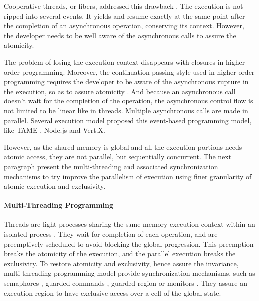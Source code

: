 Cooperative threads, or fibers, addressed this drawback \cite{Adya2002,Behren2003a}.
The execution is not ripped into several events.
It yields and resume exactly at the same point after the completion of an asynchronous operation, conserving its context.
However, the developer needs to be well aware of the asynchronous calls to assure the atomicity.

The problem of losing the execution context disappears with closures in higher-order programming.
Moreover, the continuation passing style used in higher-order programming requires the developer to be aware of the asynchronous rupture in the execution, so as to assure atomicity \cite{Sussman1998}.
And because an asynchronous call doesn't wait for the completion of the operation, the asynchronous control flow is not limited to be linear like in threads. 
Multiple asynchronous calls are made in parallel.
Several execution model proposed this event-based programming model, like TAME \cite{Krohn2007}, Node.js and Vert.X.

However, as the shared memory is global and all the execution portions needs atomic access, they are not parallel, but sequentially concurrent.
The next paragraph present the multi-threading and associated synchronization mechanisms to try improve the parallelism of execution using finer granularity of atomic execution and exclusivity.

\paragraph{Multi-Threading Programming}

Threads are light processes sharing the same memory execution context within an isolated process \cite{Dijkstra1968}.
They wait for completion of each operation, and are preemptively scheduled to avoid blocking the global progression.
This preemption breaks the atomicity of the execution, and the parallel execution breaks the exclusivity.
To restore atomicity and exclusivity, hence assure the invariance, multi-threading programming model provide synchronization mechanisms, such as semaphores \cite{Dijkstra}, guarded commands \cite{Dijkstra1975}, guarded region \cite{Hansen1978a} or monitors \cite{Hoare1974}.
They assure an execution region to have exclusive access over a cell of the global state.

